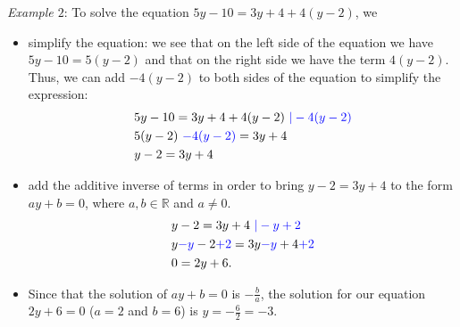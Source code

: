 \documentclass[12pt]{article}
\begin{document}
\textit{Example $2$}: To solve the equation $5y-10=3y+4+4(y-2)$, we
\begin{itemize}
\item simplify the equation: we see that on the left side of the equation we have $5y-10=5(y-2)$ and that on the right side we have the term $4(y-2)$. Thus, we can add $-4(y-2)$ to both sides of the equation to simplify the expression:
\begin{equation*}
\begin{split}
& 5y-10=3y+4+4(y-2) \textcolor{blue}{\ | -4(y-2)}\\
& 5(y-2) \textcolor{blue}{\ -4(y-2)}=3y+4\\
& y-2=3y+4\\
\end{split}
\end{equation*}
\item add the additive inverse of terms in order to bring $y-2=3y+4$ to the form $ay+b=0$, where $a,b\in \mathbb{R}$ and $a\neq 0$.
\begin{equation*}
\begin{split}
& y-2=3y+4 \textcolor{blue}{\ | -y+2}\\
& y\textcolor{blue}{-y}-2\textcolor{blue}{+2}=3y\textcolor{blue}{-y}+4\textcolor{blue}{+2}\\
& 0=2y+6.
\end{split}
\end{equation*}
\item Since that the solution of $ay+b=0$ is $-\frac{b}{a}$, the solution for our equation $2y+6=0$ ($a=2$ and $b=6$) is $y=-\frac{6}{2}=-3$.
\end{itemize}
\end{document}
